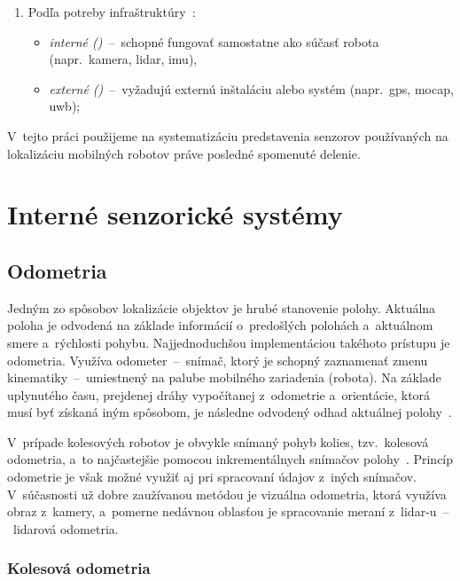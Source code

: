 \begin{enumerate}
  \item Podľa potreby infraštruktúry~\cite{ferreiraVehicleLocalizationSystem2013}:
  \begin{itemize}
    \item \emph{interné ()}~--~schopné fungovať samostatne ako súčasť robota (napr.\ kamera, \acrshort{lidar}, \acrshort{imu}),
    \item \emph{externé ()}~--~vyžadujú externú inštaláciu alebo systém (napr.\ \acrshort{gps}, \acrshort{mocap}, \acrshort{uwb});
  \end{itemize}
  \end{enumerate}

  V~tejto práci použijeme na systematizáciu predstavenia senzorov používaných na lokalizáciu mobilných robotov práve posledné spomenuté delenie.

\section{Interné senzorické systémy}\label{sec:relative}
  
  \subsection{Odometria}
    
    Jedným zo spôsobov lokalizácie objektov je hrubé stanovenie polohy. Aktuálna poloha je odvodená na základe informácií o~predošlých polohách a~aktuálnom smere a~rýchlosti pohybu. Najjednoduchšou implementáciou takéhoto prístupu je odometria. Využíva odometer~--~snímač, ktorý je schopný zaznamenať zmenu kinematiky~--~umiestnený na palube mobilného zariadenia (robota). Na základe uplynutého času, prejdenej dráhy vypočítanej z~odometrie a~orientácie, ktorá musí byť získaná iným spôsobom, je následne odvodený odhad aktuálnej polohy~\cite{duchonSnimaceMobilnejRobotike2012}.

    V~prípade kolesových robotov je obvykle snímaný pohyb kolies, tzv.\ kolesová odometria, a~to najčastejšie pomocou inkrementálnych snímačov polohy~\cite{duchonSnimaceMobilnejRobotike2012}. Princíp odometrie je však možné využiť aj pri spracovaní údajov z~iných snímačov. V~súčasnosti už dobre zaužívanou metódou je vizuálna odometria, ktorá využíva obraz z~kamery, a~pomerne nedávnou oblasťou je spracovanie meraní z~\acrshort{lidar}-u~--~lidarová odometria.

    \subsubsection{Kolesová odometria}

